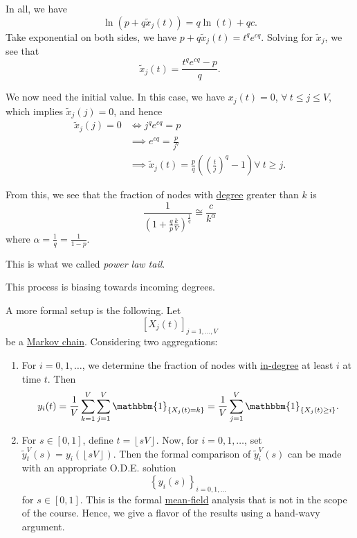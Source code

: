 In all, we have
\[
	\ln(p + q \widetilde{x}_j(t)) = q \ln(t) + qc.
\]
Take exponential on both sides, we have \(p + q \widetilde{x}_j(t) = t^q e^{cq}\).  Solving for \(\widetilde{x}_j\), we see that
\[
	\widetilde{x}_j(t) = \frac{t^q e^{cq} - p}{q}.
\]

We now need the initial value. In this case, we have \(x_{j}(t) = 0\), \(\forall\ t\leq j\leq V\), which implies \(\widetilde{x}_j(j) = 0\), and hence
\[
	\begin{split}
		\widetilde{x}_j(j) = 0
		&\iff j^q e^{cq} = p \\
		&\implies e^{cq} = \frac{p}{j^q} \\
		&\implies \widetilde{x}_j(t) = \frac{p}{q}\left(\left(\frac{t}{j}\right)^q - 1\right)\forall\ t\geq j.
	\end{split}
\]

From this, we see that the fraction of nodes with \hyperref[def:degree]{degree} greater than \(k\) is
\[
	\frac{1}{\left(1 + \frac{q}{p}\frac{k}{V}\right)^{\frac{1}{q}}} \cong \frac{c}{k^{\alpha}}
\]
where \(\alpha = \frac{1}{q} = \frac{1}{1 - p}\).

\begin{note}
	This is what we called \emph{power law tail}.
\end{note}

\begin{remark}
	This process is biasing towards incoming degrees.
\end{remark}

\begin{note}
	A more formal setup is the following. Let
	\[
		\left[X_j(t)\right]_{j = 1, \ldots , V}
	\]
	be a \hyperref[def:Markov-chain]{Markov chain}. Considering two aggregations:
	\begin{enumerate}
		\item For \(i = 0, 1, \ldots \), we determine the fraction of nodes with \hyperref[def:in-degree]{in-degree} at least \(i\) at time \(t\). Then
		      \[
			      y_{i}(t) = \frac{1}{V}\sum\limits_{k=1}^{V} \sum\limits_{j=1}^{V} \mathbbm{1}_{\{ X_{j}(t) = k \}} = \frac{1}{V}\sum\limits_{j=1}^{V} \mathbbm{1}_{\{ X_{j}(t)\geq i \}}.
		      \]
		\item For \(s\in[0, 1]\), define \(t = \left\lfloor sV\right\rfloor \). Now, for \(i = 0, 1, \ldots \), set
		      \(\widetilde{y}^V_t(s) = y_{i}(\left\lfloor sV\right\rfloor )\). Then the formal comparison of \(\widetilde{y}^V_i(s)\)
		      can be made with an appropriate O.D.E. solution
		      \[
			      \left\{y_{i}(s)\right\}_{i = 0, 1, \ldots }
		      \]
		      for \(s\in [0, 1]\). This is the formal \href{https://en.wikipedia.org/wiki/Mean-field_theory}{mean-field} analysis that is not in the
		      scope of the course. Hence, we give a flavor of the results using a hand-wavy argument.
	\end{enumerate}
\end{note}